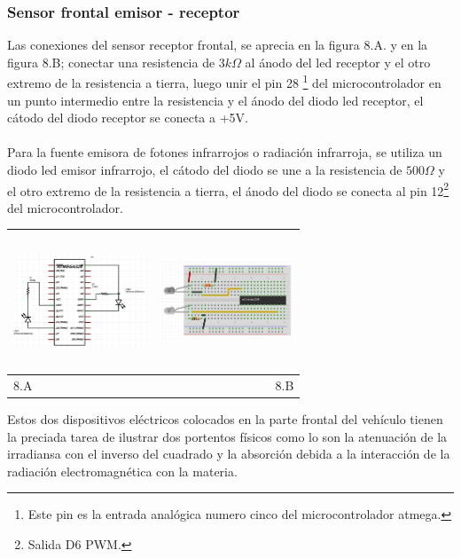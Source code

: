 \documentclass[12]{article}
\newenvironment{Figure}
{\par\medskip\noindent\minipage{\linewidth}}
{\endminipage\par\medskip}
\begin{document}
\begin{multicols}{2}
\subsubsection{Sensor frontal emisor - receptor}
Las conexiones del sensor receptor frontal, se aprecia en la figura 8.A. y en la figura 8.B; conectar una resistencia de $3 k\Omega$ al ánodo del led receptor y el otro extremo de la resistencia a tierra, luego unir el pin 28 \footnote{Este pin es la entrada analógica numero cinco del microcontrolador atmega.} del microcontrolador en un punto intermedio entre la resistencia y el ánodo del diodo led receptor, el cátodo del diodo receptor se conecta a +5V.\\\\
Para la  fuente emisora de fotones infrarrojos o radiación infrarroja, se utiliza un diodo led emisor infrarrojo, el cátodo del diodo se une  a la resistencia de $500 \Omega$ y el otro extremo de la resistencia a tierra, el ánodo del diodo se conecta al pin 12\footnote{Salida D6 PWM.} del microcontrolador.\\
\begin{Figure}
\center
\begin{tabular}{|l|r|}
\hline
\includegraphics[width=4cm, height=4cm]{img/ledesq.png} & \includegraphics[width=4cm, height=4cm]{img/ledmont.png} \\ \hline
8.A & 8.B \\ \hline
\end{tabular}
\label{fig:g8}
\end{Figure}
Estos dos dispositivos eléctricos colocados en la parte frontal del vehículo tienen la preciada tarea de ilustrar dos portentos físicos como lo son la atenuación de la irradiansa con el inverso del  cuadrado y la absorción debida a la interacción de la radiación electromagnética con la materia.

\end{multicols}
\end{document}

